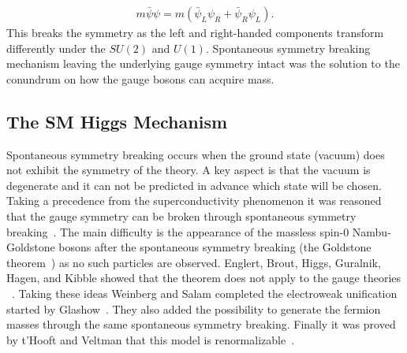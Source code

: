 \begin{eqnarray} \label{eq:fermion}
m\bar{\psi}\psi = m(\bar{\psi}_L\psi_R+\bar{\psi}_R\psi_L).
\end{eqnarray}
This breaks the symmetry as the left and right-handed components transform differently under the $SU(2)$ and $U(1)$. Spontaneous symmetry breaking mechanism leaving the underlying gauge symmetry intact was the solution to the conundrum on how the gauge bosons can acquire mass. 

\subsection{The SM Higgs Mechanism}

Spontaneous symmetry breaking occurs when the ground state (vacuum) does not exhibit the symmetry of the theory. A key aspect is that the vacuum is degenerate and it can not be predicted in advance which state will be chosen. Taking a precedence from the superconductivity phenomenon it was reasoned that the gauge symmetry can be broken through spontaneous symmetry breaking~\cite{Nambu:1960tm,Anderson:1963pc}. The main difficulty is the appearance of the massless spin-$0$ Nambu-Goldstone bosons after the spontaneous symmetry breaking (the Goldstone theorem~\cite{Goldstone:1962es}) as no such particles are observed. Englert, Brout, Higgs, Guralnik, Hagen, and Kibble showed that the theorem does not apply to the gauge theories ~\cite{Englert:1964et,Higgs:1964ia,Higgs:1964pj,Guralnik:1964eu,Higgs:1966ev,Kibble:1967sv}.  Taking these ideas Weinberg and Salam completed the electroweak unification started by Glashow~\cite{Glashow:1961tr,Weinberg:1967tq,Salam:1968rm}. They also added the possibility to generate the fermion masses through the same spontaneous symmetry breaking. Finally it was proved by t'Hooft and Veltman that this model is renormalizable~\cite{tHooft:1972fi}. 

